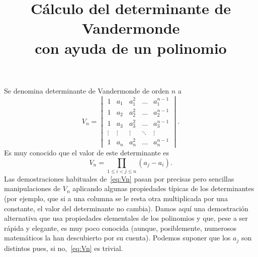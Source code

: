 \documentclass[autocontact]{gaceta}
\title{Cálculo del determinante de Vandermonde\\con ayuda de un polinomio}
\begin{document}

\previousvspace{-1.8cm}
\makesupertitle
\previousvspace{-0.25cm}
\maketitle
\vspace*{-0.4cm}
\thispagestyle{empty} %


Se denomina determinante de Vandermonde de orden $n$ a
\[
  V_n = 
  \begin{vmatrix}
  1 & a_{1} & a_{1}^{2} & \ldots & a_{1}^{n-1} \\ 
  1 & a_{2} & a_{2}^{2} & \ldots & a_{2}^{n-1} \\ 
  1 & a_{3} & a_{3}^{2} & \ldots & a_{3}^{n-1} \\ 
  \vdots & \vdots & \vdots & \ddots & \vdots \\ 
  1 & a_{n} & a_{n}^{2} & \ldots & a_{n}^{n-1} 
  \end{vmatrix}.
\]
Es muy conocido que el valor de este determinante es
\begin{equation}
\label{eq:Vn}
  V_n = \prod_{1\leq i < j\leq n}(a_{j}-a_{i}).
\end{equation}
Las demostraciones habituales de~\eqref{eq:Vn} pasan por precisas pero sencillas manipulaciones de $V_n$ aplicando algunas propiedades típicas de los determinantes (por ejemplo, que si a una columna se le resta otra multiplicada por una constante, el valor del determinante no cambia).
Damos aquí una demostración alternativa que usa propiedades elementales de los polinomios y que, pese a ser rápida y elegante, es muy poco conocida (aunque, posiblemente, numerosos matemáticos la han descubierto por su cuenta).
Podemos suponer que los $a_j$ son distintos pues, si no,~\eqref{eq:Vn} es trivial.
\end{document}
